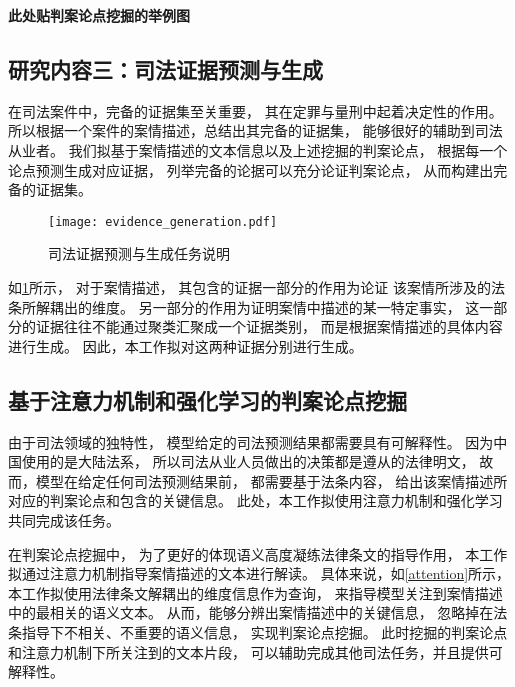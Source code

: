 \textbf{\color{red} 此处贴判案论点挖掘的举例图}

\subsection{研究内容三：司法证据预测与生成}
在司法案件中，完备的证据集至关重要，
其在定罪与量刑中起着决定性的作用。
所以根据一个案件的案情描述，总结出其完备的证据集，
能够很好的辅助到司法从业者。
我们拟基于案情描述的文本信息以及上述挖掘的判案论点，
根据每一个论点预测生成对应证据，
列举完备的论据可以充分论证判案论点，
从而构建出完备的证据集。

\begin{figure}[h]
	\centering
	\texttt{[image: evidence\_generation.pdf]}
	\caption{司法证据预测与生成任务说明}
	\label{evidence}
\end{figure}

如\cref{evidence}所示，
对于案情描述，
其包含的证据一部分的作用为论证
该案情所涉及的法条所解耦出的维度。
另一部分的作用为证明案情中描述的某一特定事实，
这一部分的证据往往不能通过聚类汇聚成一个证据类别，
而是根据案情描述的具体内容进行生成。
因此，本工作拟对这两种证据分别进行生成。


\subsection{基于注意力机制和强化学习的判案论点挖掘}

由于司法领域的独特性，
模型给定的司法预测结果都需要具有可解释性。
因为中国使用的是大陆法系，
所以司法从业人员做出的决策都是遵从的法律明文，
故而，模型在给定任何司法预测结果前，
都需要基于法条内容，
给出该案情描述所对应的判案论点和包含的关键信息。
此处，本工作拟使用注意力机制和强化学习共同完成该任务。

在判案论点挖掘中，
为了更好的体现语义高度凝练法律条文的指导作用，
本工作拟通过注意力机制指导案情描述的文本进行解读。
具体来说，如\cref{attention}所示，
本工作拟使用法律条文解耦出的维度信息作为查询，
来指导模型关注到案情描述中的最相关的语义文本。
从而，能够分辨出案情描述中的关键信息，
忽略掉在法条指导下不相关、不重要的语义信息，
实现判案论点挖掘。
此时挖掘的判案论点和注意力机制下所关注到的文本片段，
可以辅助完成其他司法任务，并且提供可解释性。

